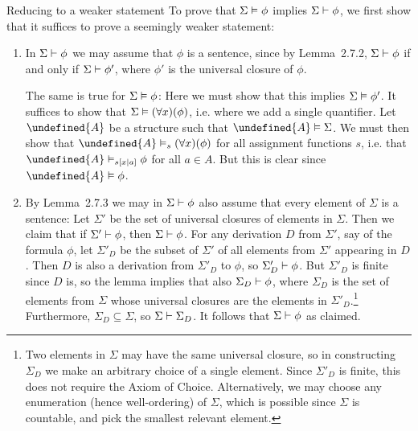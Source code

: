 \documentclass[article, a4paper, 11pt, oneside]{memoir}
\let\mathfrak\undefined
\numberwithin{equation}{chapter}
\newcommand{\frakA}{\mathfrak{A}}
\theoremstyle{nonumberplain}
\begin{document}
\begin{notelist}
    \item[Reducing to a weaker statement]
    To prove that $\Sigma \vDash \phi$ implies $\Sigma \vdash \phi$, we first show that it suffices to prove a seemingly weaker statement:
    \begin{enumerate}
        \item In $\Sigma \vdash \phi$ we may assume that $\phi$ is a sentence, since by Lemma~2.7.2, $\Sigma \vdash \phi$ if and only if $\Sigma \vdash \phi'$, where $\phi'$ is the universal closure of $\phi$. 
        
        The same is true for $\Sigma \vDash \phi$: Here we must show that this implies $\Sigma \vDash \phi'$. It suffices to show that $\Sigma \vDash (\forall x)(\phi)$, i.e. where we add a single quantifier. Let $\frakA$ be a structure such that $\frakA \models \Sigma$. We must then show that $\frakA \sats{s} (\forall x)(\phi)$ for all assignment functions $s$, i.e. that $\frakA \sats{s[x|a]} \phi$ for all $a \in A$. But this is clear since $\frakA \models \phi$.

        \item By Lemma~2.7.3 we may in $\Sigma \vdash \phi$ also assume that every element of $\Sigma$ is a sentence: Let $\Sigma'$ be the set of universal closures of elements in $\Sigma$. Then we claim that if $\Sigma' \vdash \phi$, then $\Sigma \vdash \phi$. For any derivation $D$ from $\Sigma'$, say of the formula $\phi$, let $\Sigma'_D$ be the subset of $\Sigma'$ of all elements from $\Sigma'$ appearing in $D$. Then $D$ is also a derivation from $\Sigma'_D$ to $\phi$, so $\Sigma'_D \vdash \phi$. But $\Sigma'_D$ is finite since $D$ is, so the lemma implies that also $\Sigma_D \vdash \phi$, where $\Sigma_D$ is the set of elements from $\Sigma$ whose universal closures are the elements in $\Sigma'_D$.\footnote{Two elements in $\Sigma$ may have the same universal closure, so in constructing $\Sigma_D$ we make an arbitrary choice of a single element. Since $\Sigma'_D$ is finite, this does not require the Axiom of Choice. Alternatively, we may choose any enumeration (hence well-ordering) of $\Sigma$, which is possible since $\Sigma$ is countable, and pick the smallest relevant element.} Furthermore, $\Sigma_D \subseteq \Sigma$, so $\Sigma \vdash \Sigma_D$. It follows that $\Sigma \vdash \phi$ as claimed.
        

\end{enumerate}
\end{notelist}
\end{document}
